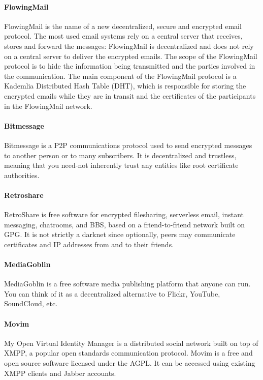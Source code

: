 \paragraph{FlowingMail}
FlowingMail is the name of a new decentralized, secure and encrypted email protocol.
The most used email systems rely on a central server that receives, stores and forward the messages: FlowingMail is decentralized and does not rely on a central server to deliver the encrypted emails.
The scope of the FlowingMail protocol is to hide the information being transmitted and the parties involved in the communication.
The main component of the FlowingMail protocol is a Kademlia Distributed Hash Table (DHT), which is responsible for storing the encrypted emails while they are in transit and the certificates of the participants in the FlowingMail network.

\paragraph{Bitmessage\cite{Warren2012Bitmessage:System}}
Bitmessage is a P2P communications protocol used to send encrypted messages to another person or to many subscribers. It is decentralized and trustless, meaning that you need-not inherently trust any entities like root certificate authorities.

\paragraph{Retroshare}
RetroShare is free software for encrypted filesharing, serverless email, instant messaging, chatrooms, and BBS, based on a friend-to-friend network built on GPG. It is not strictly a darknet since optionally, peers may communicate certificates and IP addresses from and to their friends.

\paragraph{MediaGoblin\cite{Webber2016GNUDocumentation}}
MediaGoblin is a free software media publishing platform that anyone can run. You can think of it as a decentralized alternative to Flickr, YouTube, SoundCloud, etc.

\paragraph{Movim}
My Open Virtual Identity Manager is a distributed social network built on top of XMPP, a popular open standards communication protocol. Movim is a free and open source software licensed under the AGPL. It can be accessed using existing XMPP clients and Jabber accounts.

